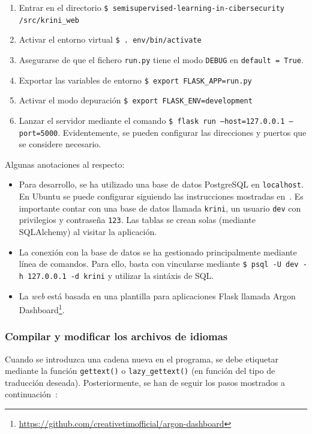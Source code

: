 \begin{enumerate}
	\item Entrar en el directorio \texttt{\$ semisupervised-learning-in-cibersecurity /src/krini\_web}
	\item Activar el entorno virtual \texttt{\$ . env/bin/activate}
	\item Asegurarse de que el fichero \texttt{run.py} tiene el modo \texttt{DEBUG} en \texttt{default = True}.
	\item Exportar las variables de entorno \texttt{\$ export FLASK\_APP=run.py}
	\item Activar el modo depuración \texttt{\$ export FLASK\_ENV=development}
	\item Lanzar el servidor mediante el comando \texttt{\$ flask run --host=127.0.0.1 --port=5000}. Evidentemente, se pueden configurar las direcciones y puertos que se considere necesario.
\end{enumerate}

Algunas anotaciones al respecto:

\begin{itemize}
	\item Para desarrollo, se ha utilizado una base de datos PostgreSQL en \texttt{localhost}. En Ubuntu se puede configurar siguiendo las instrucciones mostradas en~\cite{postgrelocal}. Es importante contar con una base de datos llamada \texttt{krini}, un usuario \texttt{dev} con privilegios y contraseña \texttt{123}. Las tablas se crean solas (mediante SQLAlchemy) al visitar la aplicación.
	\item La conexión con la base de datos se ha gestionado principalmente mediante línea de comandos. Para ello, basta con vincularse mediante \texttt{\$ psql -U dev -h 127.0.0.1 -d krini} y utilizar la sintáxis de SQL.
	\item La \textit{web} está basada en una plantilla para aplicaciones Flask llamada Argon Dashboard\footnote{\url{https://github.com/creativetimofficial/argon-dashboard}}.
\end{itemize}

\subsubsection{Compilar y modificar los archivos de idiomas}

Cuando se introduzca una cadena nueva en el programa, se debe etiquetar mediante la función \texttt{gettext()} o \texttt{lazy\_gettext()} (en función del tipo de traducción deseada). Posteriormente, se han de seguir los pasos mostrados a continuación~\cite{pybabelmanual}:

